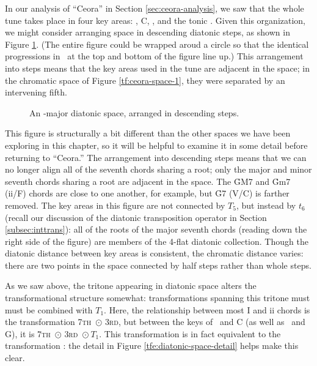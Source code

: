 {In our analysis of ``Ceora'' in Section \ref{sec:ceora-analysis}, we saw that
the whole tune takes place in four key areas: \Dflat, C, \Bflat, and the tonic
\Aflat. Given this organization, we might consider arranging \tf space in
descending diatonic steps, as shown in Figure \ref{tfe:ab-diatonic-space}.
(The entire figure could be wrapped aroud a circle so that the identical \tfo
progressions in \Aflat\ at the top and bottom of the figure line up.) This
arrangement into steps means that the key areas used in the tune are adjacent
in the space; in the chromatic space of Figure \ref{tf:ceora-space-1}, they
were separated by an intervening fifth.

\begin{figure}[tbh]
  \caption{An \Aflat{}-major diatonic \tf space, arranged in descending steps.}
  \label{tfe:ab-diatonic-space}
\end{figure}

This figure is structurally a bit different than the other spaces we have been
exploring in this chapter, so it will be helpful to examine it in some detail
before returning to ``Ceora.'' The arrangement into descending steps means
that we can no longer align all of the seventh chords sharing a root; only the
major and minor seventh chords sharing a root are adjacent in the
space. The \h{GM7} and \h{Gm7} (ii/F) chords are close to
one another, for example, but \h{G7} (V/C) is farther removed. The key
areas in this figure are not connected by $T_5$, but instead by $t_6$ (recall
our discussion of the diatonic transposition operator in Section
\ref{subsec:inttrans}): all of the roots of the major seventh chords (reading
down the right side of the figure) are members of the 4-flat diatonic
collection. Though the diatonic distance between key areas is consistent, the
chromatic distance varies: there are two points in the space connected by half
steps rather than whole steps.

As we saw above, the tritone appearing in diatonic space alters the
transformational structure somewhat: transformations spanning this tritone
must must be combined with $T_1$. Here, the relationship between most
I and ii chords is the transformation \textsc{7th}~$\odot$
\textsc{3rd}, but between the keys of \Dflat\ and C (as well as \Aflat\ and G), it is
\textsc{7th}~$\odot$ \textsc{3rd}~$\odot\ T_1$. This transformation is in fact
equivalent to the transformation \slideS: the detail in Figure
\ref{tfe:diatonic-space-detail} helps make this clear.

}
